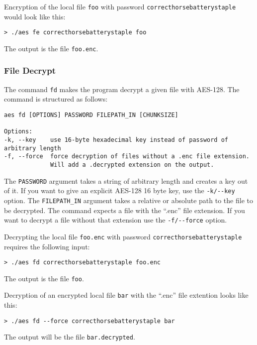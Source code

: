 Encryption of the local file \lstinline|foo| with password \lstinline|correcthorsebatterystaple| would look like this:
\begin{lstlisting}
> ./aes fe correcthorsebatterystaple foo
\end{lstlisting}
The output is the file \lstinline|foo.enc|.


\subsubsection{File Decrypt}
The command \lstinline{fd} makes the program decrypt a given file with AES-128. The command is structured as follows:
\begin{lstlisting}
aes fd [OPTIONS] PASSWORD FILEPATH_IN [CHUNKSIZE]

Options:
-k, --key    use 16-byte hexadecimal key instead of password of arbitrary length
-f, --force  force decryption of files without a .enc file extension.
             Will add a .decrypted extension on the output.
\end{lstlisting}
The \lstinline{PASSWORD} argument takes a string of arbitrary length and creates a key out of it. If you want to give an explicit AES-128 16 byte key, use the \lstinline{-k/--key} option. The \lstinline{FILEPATH_IN} argument takes a relative or absolute path to the file to be decrypted. The command expects a file with the \enquote{.enc} file extension. If you want to decrypt a file without that extension use the \lstinline{-f/--force} option.

Decrypting the local file \lstinline|foo.enc| with password \lstinline|correcthorsebatterystaple| requires the following input:
\begin{lstlisting}
> ./aes fd correcthorsebatterystaple foo.enc
\end{lstlisting}
The output is the file \lstinline|foo|.

Decryption of an encrypted local file \lstinline|bar| with the \enquote{.enc} file extention looks like this:
\begin{lstlisting}
> ./aes fd --force correcthorsebatterystaple bar
\end{lstlisting}
The output will be the file \lstinline|bar.decrypted|.

